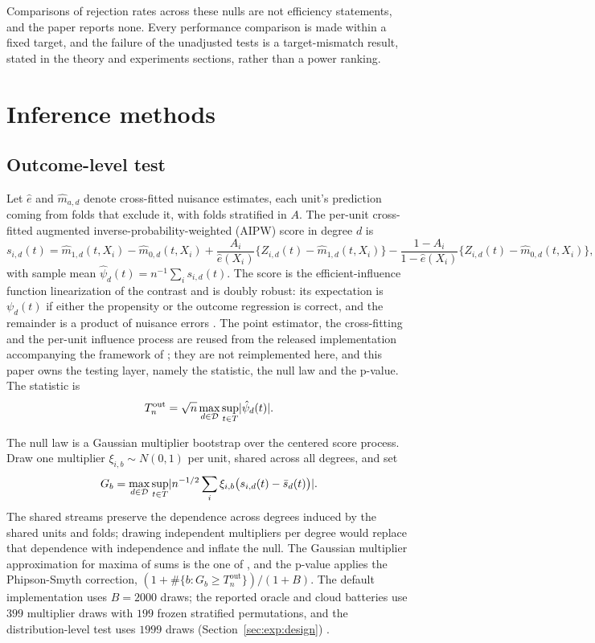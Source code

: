 Comparisons of rejection rates across these nulls are not efficiency statements, and the paper
reports none. Every performance comparison is made within a fixed target, and the failure of the
unadjusted tests is a target-mismatch result, stated in the theory and experiments sections,
rather than a power ranking.

\section{Inference methods}
\label{sec:methods}

\subsection{Outcome-level test}

Let $\hat e$ and $\hat m_{a,d}$ denote cross-fitted nuisance estimates, each unit's prediction
coming from folds that exclude it, with folds stratified in $A$. The per-unit cross-fitted augmented inverse-probability-weighted (AIPW)
score in degree $d$ is
\begin{equation}
\label{eq:outscore}
s_{i,d}(t) = \hat m_{1,d}(t,X_i) - \hat m_{0,d}(t,X_i)
+ \frac{A_i}{\hat e(X_i)}\bigl\{Z_{i,d}(t) - \hat m_{1,d}(t,X_i)\bigr\}
- \frac{1-A_i}{1-\hat e(X_i)}\bigl\{Z_{i,d}(t) - \hat m_{0,d}(t,X_i)\bigr\},
\end{equation}
with sample mean $\hat\psi_d(t) = n^{-1}\sum_i s_{i,d}(t)$. The score is the efficient-influence
function linearization of the contrast and is doubly robust: its expectation is $\psi_d(t)$ if
either the propensity or the outcome regression is correct, and the remainder is a product of
nuisance errors \cite{souto_diamantis_tcda_2026,chernozhukov_dml_2018,kennedy_drlearner_2023}. The
point estimator, the cross-fitting and the per-unit influence process are reused from the
released implementation accompanying the framework of \cite{souto_diamantis_tcda_2026}; they are
not reimplemented here, and this paper owns the testing layer, namely the statistic, the null law
and the p-value.
The statistic is
\begin{equation}
\label{eq:tnout}
T_n^{\mathrm{out}} = \sqrt n \max_{d \in \mathcal D} \sup_{t \in T} \lvert \hat\psi_d(t)\rvert.
\end{equation}

The null law is a Gaussian multiplier bootstrap over the centered score process. Draw one
multiplier $\xi_{i,b} \sim N(0,1)$ per unit, shared across all degrees, and set
\[
G_b = \max_{d \in \mathcal D} \sup_{t \in T} \lvert n^{-1/2}\sum_i \xi_{i,b}\bigl(s_{i,d}(t) - \bar
s_d(t)\bigr)\rvert.
\]
The shared streams preserve the dependence across degrees induced by the shared units
and folds; drawing independent multipliers per degree would replace that dependence with
independence and inflate the null. The Gaussian multiplier approximation for maxima of sums is the
one of \cite{cck_2013}, and the p-value applies the Phipson-Smyth correction,
$(1 + \#\{b : G_b \ge T_n^{\mathrm{out}}\})/(1+B)$. The default implementation uses
$B=2000$ draws; the reported oracle and cloud batteries use $399$ multiplier draws
with $199$ frozen stratified permutations, and the distribution-level test uses
$1999$ draws (Section~\ref{sec:exp:design}) \cite{phipson_smyth_2010}.

